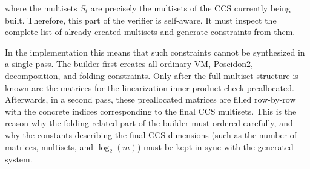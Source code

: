 where the multisets $S_i$ are precisely the multisets of the CCS currently being
built. Therefore, this part of the verifier is self-aware. It must inspect the
complete list of already created multisets and generate constraints from them.

In the implementation this means that such constraints cannot be synthesized in
a single pass. The builder first creates all ordinary VM, Poseidon2,
decomposition, and folding constraints. Only after the full multiset structure
is known are the matrices for the linearization inner-product check
preallocated. Afterwards, in a second pass, these preallocated matrices are
filled row-by-row with the concrete indices corresponding to the final CCS
multisets. This is the reason why the folding related part of the builder must
ordered carefully, and why the constants describing the final CCS dimensions
(such as the number of matrices, multisets, and $\log_2(m)$) must be kept in
sync with the generated system.
